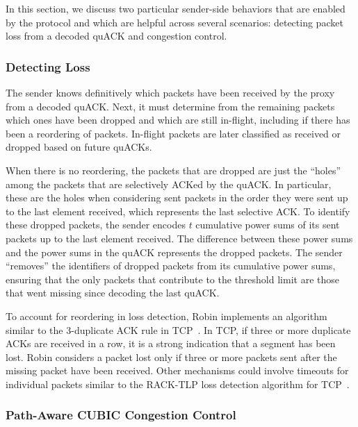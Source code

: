 In this section, we discuss two particular sender-side behaviors that are enabled by
the \sys protocol and which are helpful across several scenarios: detecting packet loss
from a decoded quACK and congestion control.

\subsubsection{Detecting Loss}
\label{sec:design:detecting-loss}

The sender knows definitively which packets have been received by the proxy from
a decoded quACK. Next, it must determine from the remaining packets which ones
have been dropped and which are still in-flight, including if there has been a
reordering of packets. In-flight packets are later
classified as received or dropped based on future quACKs.

When there is no reordering, the packets that are dropped are just the ``holes''
among the packets that are selectively ACKed by the quACK. In particular, these
are the holes when considering sent packets in the order they were sent up to
the last element received, which represents the last selective ACK.
To identify these dropped packets, the sender encodes $t$ cumulative power sums
of its sent packets up to the last element received.
The difference between these power sums and the power
sums in the quACK represents the dropped packets. The sender ``removes'' the
identifiers of dropped packets from its cumulative power sums, ensuring that
the only packets that contribute to the threshold limit are those that
went missing since decoding the last quACK.

To account for reordering in loss detection, Robin implements an algorithm
similar to the 3-duplicate ACK rule in TCP~\cite{rfc5681tcp,rfc2001tcp}.
In TCP, if three or more duplicate ACKs are received in a row, it is a strong
indication that a segment has been lost. Robin considers a packet lost only if
three or more packets sent after the missing packet have been received.
Other mechanisms could involve timeouts for individual packets similar to the
RACK-TLP loss detection algorithm for TCP~\cite{rfc8985}.

\subsubsection{Path-Aware CUBIC Congestion Control}
\label{sec:design:cubic}

